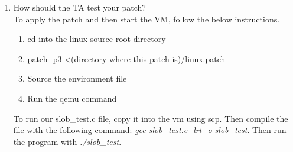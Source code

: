 \documentclass[letterpaper,10pt,draftclsnofoot,onecolumn,titlepage]{IEEEtran}
\begin{document}
\begin{enumerate}
		\item How should the TA test your patch? \\
To apply the patch and then start the VM, follow the below instructions. 

	\begin{enumerate}
		\item cd into the linux source root directory
		\item patch -p3 \textless (directory where this patch is)/linux.patch
		\item Source the environment file 
		\item Run the qemu command
	\end{enumerate} 
To run our slob\_test.c file, copy it into the vm using scp. 
Then compile the file with the following command: \textit{gcc slob\_test.c -lrt -o slob\_test}.
Then run the program with \textit{./slob\_test}.
 

\end{enumerate}
\end{document}
